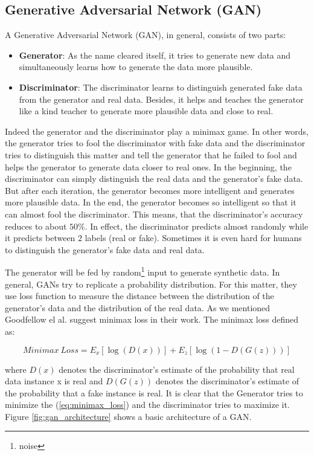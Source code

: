 \subsection{Generative Adversarial Network (GAN)}
\label{tit:Generative-Adversarial-Network}
A Generative Adversarial Network (GAN), in general, consists of two parts:
\begin{itemize}
  \item \textbf{Generator}: As the name cleared itself, it tries to generate new data and simultaneously learns how to generate the data more plausible.
  \item \textbf{Discriminator}: The discriminator learns to distinguish generated fake data from the generator and real data. Besides, it helps and teaches the generator like a kind teacher to generate more plausible data and close to real.
\end{itemize}

Indeed the generator and the discriminator play a minimax game. In other words, the generator
tries to fool the discriminator with fake data and the discriminator tries to distinguish this
matter and tell the generator that he failed to fool and helps the generator to generate data
closer to real ones. In the beginning, the discriminator can simply distinguish the real data and
the generator's fake data. But after each iteration, the generator becomes more intelligent and
generates more plausible data.  In the end, the generator becomes so intelligent so that it can
almost fool the discriminator. This means, that the discriminator's accuracy reduces to about
$50\%$. In effect, the discriminator predicts almost randomly while it predicts between $2$ labels
(real or fake). Sometimes it is even hard for humans to distinguish the
generator's fake data and real data.

The generator will be fed by random\footnote{noise}
input to generate synthetic data. In general, GANs try to replicate a probability distribution. For this matter, they use loss function to measure the distance between the distribution of the generator's data and the distribution of the real data. As we mentioned Goodfellow el al. \cite{Same} suggest minimax loss in their work. The minimax loss defined as:

\begin{equation} \label{eq:minimax_loss}
  Minimax\ Loss = E_{x}[\log (D(x))]+E_{z}[\log (1-D(G(z)))]
\end{equation}


where $D(x)$  denotes the discriminator's estimate of the probability that real data instance x is
real and $D(G(z))$ denotes the discriminator's estimate of the probability that a fake instance is
real. It is clear that the Generator tries to minimize the (\ref{eq:minimax_loss}) and the
discriminator tries to maximize it. Figure \ref{fig:gan_architecture} shows a basic architecture of a
GAN.

